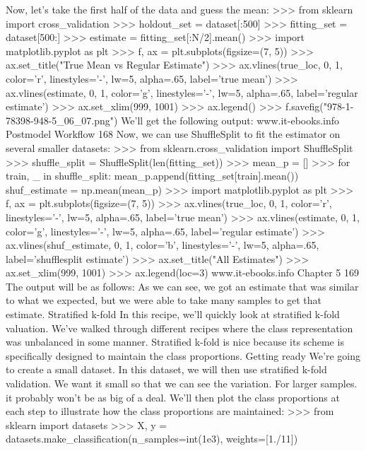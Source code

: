 Now, let's take the first half of the data and guess the mean:
>>> from sklearn import cross_validation
>>> holdout_set = dataset[:500]
>>> fitting_set = dataset[500:]
>>> estimate = fitting_set[:N/2].mean()
>>> import matplotlib.pyplot as plt
>>> f, ax = plt.subplots(figsize=(7, 5))
>>> ax.set_title("True Mean vs Regular Estimate")
>>> ax.vlines(true_loc, 0, 1, color='r', linestyles='-', lw=5,
alpha=.65, label='true mean')
>>> ax.vlines(estimate, 0, 1, color='g', linestyles='-', lw=5,
alpha=.65, label='regular estimate')
>>> ax.set_xlim(999, 1001)
>>> ax.legend()
>>> f.savefig("978-1-78398-948-5_06_07.png")
We'll get the following output:
www.it-ebooks.info
Postmodel Workflow
168
Now, we can use ShuffleSplit to fit the estimator on several smaller datasets:
>>> from sklearn.cross_validation import ShuffleSplit
>>> shuffle_split = ShuffleSplit(len(fitting_set))
>>> mean_p = []
>>> for train, _ in shuffle_split:
mean_p.append(fitting_set[train].mean())
shuf_estimate = np.mean(mean_p)
>>> import matplotlib.pyplot as plt
>>> f, ax = plt.subplots(figsize=(7, 5))
>>> ax.vlines(true_loc, 0, 1, color='r', linestyles='-', lw=5,
alpha=.65, label='true mean')
>>> ax.vlines(estimate, 0, 1, color='g', linestyles='-', lw=5,
alpha=.65, label='regular estimate')
>>> ax.vlines(shuf_estimate, 0, 1, color='b', linestyles='-', lw=5,
alpha=.65, label='shufflesplit estimate')
>>> ax.set_title("All Estimates")
>>> ax.set_xlim(999, 1001)
>>> ax.legend(loc=3)
www.it-ebooks.info
Chapter 5
169
The output will be as follows:
As we can see, we got an estimate that was similar to what we expected, but we were able to
take many samples to get that estimate.
Stratified k-fold
In this recipe, we'll quickly look at stratified k-fold valuation. We've walked through different
recipes where the class representation was unbalanced in some manner. Stratified k-fold is
nice because its scheme is specifically designed to maintain the class proportions.
Getting ready
We're going to create a small dataset. In this dataset, we will then use stratified k-fold validation.
We want it small so that we can see the variation. For larger samples. it probably won't be as big
of a deal.
We'll then plot the class proportions at each step to illustrate how the class proportions
are maintained:
>>> from sklearn import datasets
>>> X, y = datasets.make_classification(n_samples=int(1e3),
weights=[1./11])


